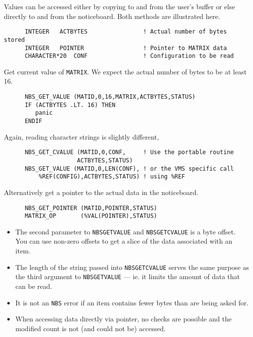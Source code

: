 \documentclass[twoside,11pt]{article}
\renewcommand{\_}{\texttt{\symbol{95}}}
\begin{document}
Values can be accessed either by copying to and from the user's buffer or else
directly to and from the noticeboard. Both methods are illustrated here.

\begin {verbatim}
      INTEGER   ACTBYTES                ! Actual number of bytes stored
      INTEGER   POINTER                 ! Pointer to MATRIX data
      CHARACTER*20  CONF                ! Configuration to be read
\end{verbatim}

Get current value of {\tt MATRIX}. We expect the actual number of bytes to
be at least 16.

\begin {verbatim}
      NBS_GET_VALUE (MATID,0,16,MATRIX,ACTBYTES,STATUS)
      IF (ACTBYTES .LT. 16) THEN
         panic
      ENDIF
\end{verbatim}

Again, reading character strings is slightly different,

\begin {verbatim}
      NBS_GET_CVALUE (MATID,0,CONF,     ! Use the portable routine
                     ACTBYTES,STATUS)
      NBS_GET_VALUE (MATID,0,LEN(CONF), ! or the VMS specific call
\end{verbatim}

Alternatively get a pointer to the actual data in the noticeboard.

\begin {verbatim}
      NBS_GET_POINTER (MATID,POINTER,STATUS)
      MATRIX_OP       (%
\end{verbatim}

\begin {itemize}
\item The second parameter to {\tt NBS\_GET\_VALUE} and {\tt NBS\_GET\_CVALUE} 
is a byte offset. You can use non-zero offsets to get a slice of the 
data associated with an item.
\item The length of the string passed into {\tt NBS\_GET\_CVALUE} serves 
the same purpose as the third argument to {\tt NBS\_GET\_VALUE} --- ie. it
limits the amount of data that can be read. 
\item It is not an {\tt NBS} error if an item contains fewer bytes than are
being asked for.
\item When accessing data directly via pointer, no checks are possible and the
modified count is not (and could not be) accessed.
\end {itemize}
\end{document}
